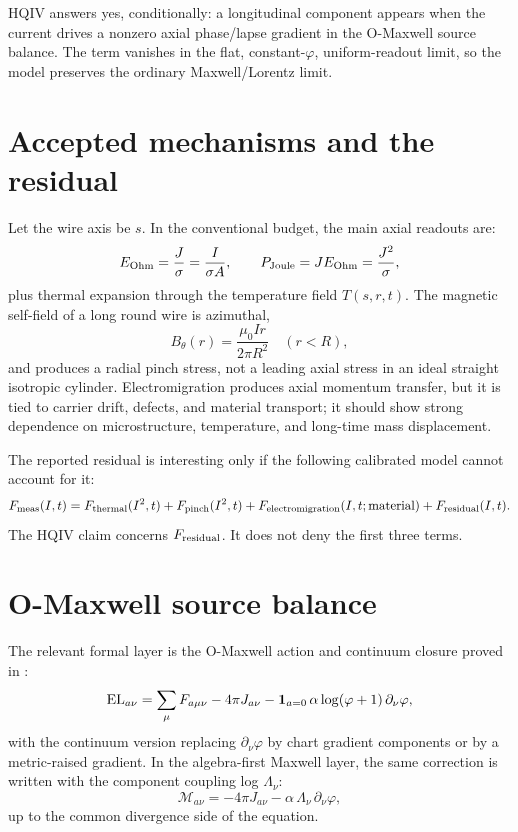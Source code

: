 \documentclass[11pt]{amsart}
\begin{document}
HQIV answers yes, conditionally: a longitudinal component appears when the current drives a nonzero axial phase/lapse gradient in the O-Maxwell source balance. The term vanishes in the flat, constant-$\varphi$, uniform-readout limit, so the model preserves the ordinary Maxwell/Lorentz limit.

\section{Accepted mechanisms and the residual}

Let the wire axis be $s$. In the conventional budget, the main axial readouts are:
\[
E_{\rm Ohm}=\frac{J}{\sigma}=\frac{I}{\sigma A},
\qquad
P_{\rm Joule}=J E_{\rm Ohm}=\frac{J^2}{\sigma},
\]
plus thermal expansion through the temperature field $T(s,r,t)$. The magnetic self-field of a long round wire is azimuthal,
\[
B_\theta(r)=\frac{\mu_0 I r}{2\pi R^2}\quad (r<R),
\]
and produces a radial pinch stress, not a leading axial stress in an ideal straight isotropic cylinder. Electromigration produces axial momentum transfer, but it is tied to carrier drift, defects, and material transport; it should show strong dependence on microstructure, temperature, and long-time mass displacement.

The reported residual is interesting only if the following calibrated model cannot account for it:
\[
F_{\rm meas}(I,t)
  = F_{\rm thermal}(I^2,t)
  + F_{\rm pinch}(I^2,t)
  + F_{\rm electromigration}(I,t;{\rm material})
  + F_{\rm residual}(I,t).
\]
The HQIV claim concerns $F_{\rm residual}$. It does not deny the first three terms.

\section{O-Maxwell source balance}
\label{sec:omaxwell}

The relevant formal layer is the O-Maxwell action and continuum closure proved in
\cite{hqiv-oct-action-paper}:
\[
{\rm EL}_{a\nu}
  =
  \sum_\mu F_{a\mu\nu}
  -4\pi J_{a\nu}
  - \mathbf{1}_{a=0}\,\alpha \log(\varphi+1)\,\partial_\nu\varphi ,
\]
with the continuum version replacing $\partial_\nu\varphi$ by chart gradient components or by a metric-raised gradient. In the algebra-first Maxwell layer, the same correction is written with the component coupling log $\Lambda_\nu$:
\[
\mathcal{M}_{a\nu}
  =
  -4\pi J_{a\nu}
  -\alpha\,\Lambda_\nu\,\partial_\nu\varphi ,
\]
up to the common divergence side of the equation.
\end{document}
